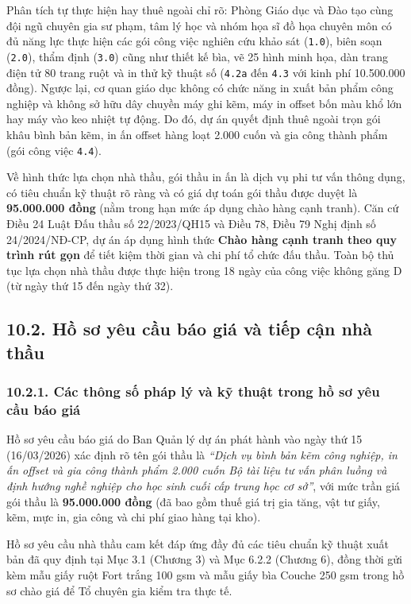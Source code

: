 Phân tích tự thực hiện hay thuê ngoài chỉ rõ: Phòng Giáo dục và Đào tạo cùng đội ngũ chuyên gia sư phạm, tâm lý học và nhóm họa sĩ đồ họa chuyên môn có đủ năng lực thực hiện các gói công việc nghiên cứu khảo sát (\texttt{1.0}), biên soạn (\texttt{2.0}), thẩm định (\texttt{3.0}) cũng như thiết kế bìa, vẽ 25 hình minh họa, dàn trang điện tử 80 trang ruột và in thử kỹ thuật số (\texttt{4.2a} đến \texttt{4.3} với kinh phí 10.500.000 đồng). Ngược lại, cơ quan giáo dục không có chức năng in xuất bản phẩm công nghiệp và không sở hữu dây chuyền máy ghi kẽm, máy in offset bốn màu khổ lớn hay máy vào keo nhiệt tự động. Do đó, dự án quyết định thuê ngoài trọn gói khâu bình bản kẽm, in ấn offset hàng loạt 2.000 cuốn và gia công thành phẩm (gói công việc \texttt{4.4}).

Về hình thức lựa chọn nhà thầu, gói thầu in ấn là dịch vụ phi tư vấn thông dụng, có tiêu chuẩn kỹ thuật rõ ràng và có giá dự toán gói thầu được duyệt là \textbf{95.000.000 đồng} (nằm trong hạn mức áp dụng chào hàng cạnh tranh). Căn cứ Điều 24 Luật Đấu thầu số 22/2023/QH15 và Điều 78, Điều 79 Nghị định số 24/2024/NĐ-CP, dự án áp dụng hình thức \textbf{Chào hàng cạnh tranh theo quy trình rút gọn} để tiết kiệm thời gian và chi phí tổ chức đấu thầu. Toàn bộ thủ tục lựa chọn nhà thầu được thực hiện trong 18 ngày của công việc không găng D (từ ngày thứ 15 đến ngày thứ 32).

\subsection{10.2. Hồ sơ yêu cầu báo giá và tiếp cận nhà thầu}

\subsubsection{10.2.1. Các thông số pháp lý và kỹ thuật trong hồ sơ yêu cầu báo giá}

Hồ sơ yêu cầu báo giá do Ban Quản lý dự án phát hành vào ngày thứ 15 (16/03/2026) xác định rõ tên gói thầu là \textit{``Dịch vụ bình bản kẽm công nghiệp, in ấn offset và gia công thành phẩm 2.000 cuốn Bộ tài liệu tư vấn phân luồng và định hướng nghề nghiệp cho học sinh cuối cấp trung học cơ sở''}, với mức trần giá gói thầu là \textbf{95.000.000 đồng} (đã bao gồm thuế giá trị gia tăng, vật tư giấy, kẽm, mực in, gia công và chi phí giao hàng tại kho).

Hồ sơ yêu cầu nhà thầu cam kết đáp ứng đầy đủ các tiêu chuẩn kỹ thuật xuất bản đã quy định tại Mục 3.1 (Chương 3) và Mục 6.2.2 (Chương 6), đồng thời gửi kèm mẫu giấy ruột Fort trắng 100 gsm và mẫu giấy bìa Couche 250 gsm trong hồ sơ chào giá để Tổ chuyên gia kiểm tra thực tế.

